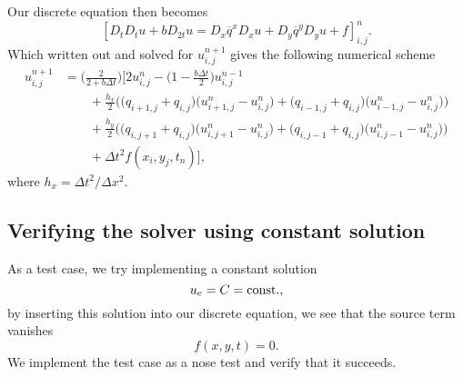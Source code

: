 \documentclass[a4paper, 11pt, notitlepage, english]{article}
\begin{document}
Our discrete equation then becomes
$$[D_tD_t u + bD_{2t}u = D_x \overline{q}^{x}D_x u + D_y \overline{q}^y D_y u + f]^{n}_{i,j}.$$
Which written out and solved for $u_{i,j}^{n+1}$ gives the following numerical scheme
\begin{align*}
u_{i,j}^{n+1} &= \bigg(\frac{2}{2+b\Delta t}\bigg)\Bigg[2u_{i,j}^n - \bigg(1-\frac{b\Delta t}{2}\bigg)u_{i,j}^{n-1} \\ 
&\qquad + \frac{h_x}{2}\bigg(\big(q_{i+1,j}+q_{i,j}\big)\big(u_{i+1,j}^n-u_{i,j}^n\big) + \big(q_{i-1,j} + q_{i,j}\big)\big(u_{i-1,j}^n-u_{i,j}^n\big)\bigg) \\
&\qquad + \frac{h_y}{2}\bigg(\big(q_{i,j+1}+q_{i,j}\big)\big(u_{i,j+1}^n-u_{i,j}^n\big) + \big(q_{i,j-1} + q_{i,j}\big)\big(u_{i,j-1}^n-u_{i,j}^n\big)\bigg) \\
&\qquad + \Delta t^2 f(x_i, y_j, t_n) \bigg],
\end{align*}
where $h_x = \Delta t^2/\Delta x^2$.

\subsection*{Verifying the solver using constant solution}
As a test case, we try implementing a constant solution
$$u_e = C = {\rm const.},$$
by inserting this solution into our discrete equation, we see that the source term vanishes
$$f(x,y,t) = 0.$$
We implement the test case as a nose test and verify that it succeeds.

\subsection*{}
\end{document}
